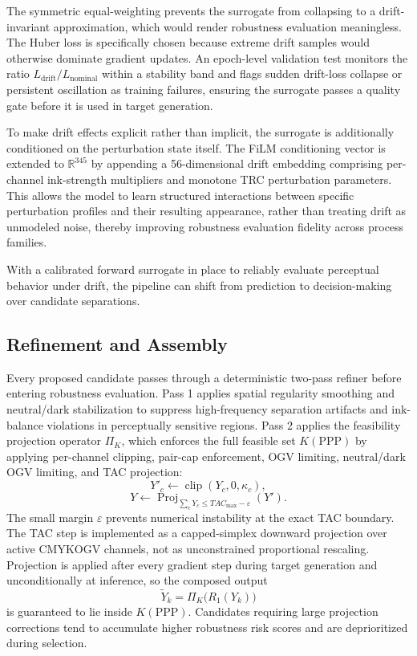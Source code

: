 \documentclass[acmsmall,screen,nonacm]{acmart}
\begin{document}
The symmetric equal-weighting prevents the surrogate from collapsing to a drift-invariant approximation, which would render robustness evaluation meaningless. The Huber loss is specifically chosen because extreme drift samples would otherwise dominate gradient updates. An epoch-level validation test monitors the ratio $L_{\text{drift}}/L_{\text{nominal}}$ within a stability band and flags sudden drift-loss collapse or persistent oscillation as training failures, ensuring the surrogate passes a quality gate before it is used in target generation.

To make drift effects explicit rather than implicit, the surrogate is additionally conditioned on the perturbation state itself. The FiLM conditioning vector is extended to $\mathbb{R}^{345}$ by appending a 56-dimensional drift embedding comprising per-channel ink-strength multipliers and monotone TRC perturbation parameters. This allows the model to learn structured interactions between specific perturbation profiles and their resulting appearance, rather than treating drift as unmodeled noise, thereby improving robustness evaluation fidelity across process families.

With a calibrated forward surrogate in place to reliably evaluate perceptual behavior under drift, the pipeline can shift from prediction to decision-making over candidate separations.

\subsection{Refinement and Assembly}

Every proposed candidate passes through a deterministic two-pass refiner before entering robustness evaluation. Pass 1 applies spatial regularity smoothing and neutral/dark stabilization to suppress high-frequency separation artifacts and ink-balance violations in perceptually sensitive regions. Pass 2 applies the feasibility projection operator $\Pi_K$, which enforces the full feasible set $K(\mathrm{PPP})$ by applying per-channel clipping, pair-cap enforcement, OGV limiting, neutral/dark OGV limiting, and TAC projection:
\[
Y'_c \leftarrow \operatorname{clip}(Y_c, 0, \kappa_c),
\]
\[
Y \leftarrow \operatorname{Proj}_{\sum_c Y_c \leq TAC_{\max}-\varepsilon}(Y').
\]
The small margin $\varepsilon$ prevents numerical instability at the exact TAC boundary. The TAC step is implemented as a capped-simplex downward projection over active CMYKOGV channels, not as unconstrained proportional rescaling. Projection is applied after every gradient step during target generation and unconditionally at inference, so the composed output
\[
\tilde{Y}_k = \Pi_K\bigl(R_1(Y_k)\bigr)
\]
is guaranteed to lie inside $K(\mathrm{PPP})$. Candidates requiring large projection corrections tend to accumulate higher robustness risk scores and are deprioritized during selection.
\end{document}
